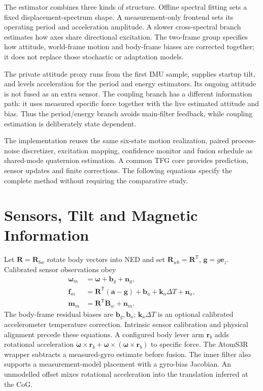 \documentclass[conference]{IEEEtran}
\newcommand{\vc}[1]{\bm{#1}}
\newcommand{\mt}[1]{\bm{#1}}
\newcommand{\tr}{^{\mathsf T}}
\begin{document}
The estimator combines three kinds of structure. Offline spectral fitting
sets a fixed displacement-spectrum shape. A measurement-only frontend sets
its operating period and acceleration amplitude. A slower cross-spectral
branch estimates how axes share directional excitation. The two-frame group
specifies how attitude, world-frame motion and body-frame biases are corrected
together; it does not replace those stochastic or adaptation models.

The private attitude proxy runs from the first IMU sample, supplies startup
tilt, and levels acceleration for the period and energy estimators. Its
ongoing attitude is not fused as an extra sensor. The coupling branch has a
different information path: it uses measured specific force together with
the live estimated attitude and bias. Thus the period/energy branch avoids
main-filter feedback, while coupling estimation is deliberately state dependent.

The implementation reuses the same six-state motion realization, paired
process-noise discretizer, excitation mapping, confidence monitor and fusion
schedule as shared-mode quaternion estimation. A common TFG core provides
prediction, sensor updates and finite corrections. The following equations
specify the complete method without requiring the comparative study.

\section{Sensors, Tilt and Magnetic Information}
\label{sec:sensors}
Let $\mt R=\mt R_{bw}$ rotate body vectors into NED and set
$\mt R_{wb}=\mt R\tr$, $\vc g=g\vc e_z$. Calibrated sensor observations obey
\begin{align}
 \vc\omega_m&=\vc\omega+\vc b_g+\vc n_g,\label{eq:gyro}\\
 \vc f_m&=\mt R\tr(\vc a-\vc g)+\vc b_a+\vc k_a\Delta T+\vc n_a,\label{eq:acc}\\
 \vc m_m&=\mt R\tr\vc B_w+\vc n_m.\label{eq:mag}
\end{align}
The body-frame residual biases are $\vc b_g,\vc b_a$; $\vc k_a\Delta T$ is
an optional calibrated accelerometer temperature correction. Intrinsic sensor
calibration and physical alignment precede these equations. A configured
body lever arm $\vc r_b$ adds rotational acceleration
$\dot{\vc\omega}\times\vc r_b+
\vc\omega\times(\vc\omega\times\vc r_b)$ to specific force. The AtomS3R wrapper subtracts a measured-gyro estimate
before fusion. The inner filter also supports a measurement-model placement
with a gyro-bias Jacobian. An unmodelled offset mixes rotational acceleration
into the translation inferred at the CoG.
\end{document}

